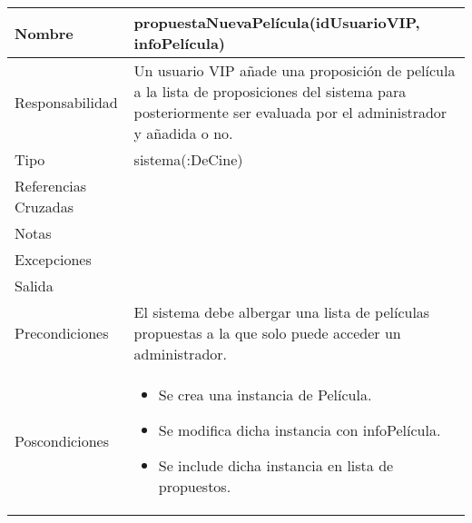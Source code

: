 \documentclass{article}
\begin{document}
\begin{table}[h]
\begin{tabular}{|l|l|l|l|l|l|}
\hline
\multicolumn{2}{|p{3cm}|}{Nombre} & \multicolumn{4}{p{10cm}|}{\textbf{propuestaNuevaPelícula(idUsuarioVIP, infoPelícula)}}\\
\hline
\multicolumn{2}{|p{3cm}|}{Responsabilidad} & \multicolumn{4}{p{10cm}|}{Un usuario VIP añade una proposición de película a la lista de proposiciones del sistema para posteriormente ser evaluada por el administrador y añadida o no.} \\
\hline
\multicolumn{2}{|p{3cm}|}{Tipo} & \multicolumn{4}{p{10cm}|}{sistema(:DeCine)} \\
\hline
\multicolumn{2}{|p{3cm}|}{Referencias Cruzadas} & \multicolumn{4}{p{10cm}|}{} \\
\hline
\multicolumn{2}{|p{3cm}|}{Notas} & \multicolumn{4}{p{10cm}|}{} \\
\hline
\multicolumn{2}{|p{3cm}|}{Excepciones} & \multicolumn{4}{p{10cm}|}{} \\
\hline
\multicolumn{2}{|p{3cm}|}{Salida} & \multicolumn{4}{p{10cm}|}{} \\
\hline
\multicolumn{2}{|p{3cm}|}{Precondiciones} & \multicolumn{4}{p{10cm}|}{El sistema debe albergar una lista de películas propuestas a la que solo puede acceder un administrador.} \\
\hline
\multicolumn{2}{|p{3cm}|}{Poscondiciones} & \multicolumn{4}{p{10cm}|}{\begin{itemize}
\item Se crea una instancia de Película.
\item Se modifica dicha instancia con infoPelícula.
\item Se include dicha instancia en lista de propuestos.
\end{itemize}} \\
\hline
\end{tabular}
\end{table}
\end{document}
